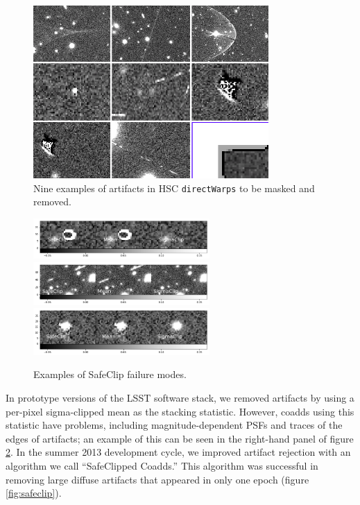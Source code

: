 \documentclass[DM,authoryear,toc]{lsstdoc}
\begin{document}
\begin{figure}
\begin{centering}
\includegraphics[width=0.8\textwidth]{figures/9examples.png}
\par\end{centering}
\caption{\label{fig:NineExamples} Nine examples of artifacts in HSC \texttt{directWarps} to be masked and removed.}
\end{figure}

\begin{figure}
\begin{centering}
\includegraphics[width=0.6\textwidth]{figures/safeClip1.png}
\includegraphics[width=0.6\textwidth]{figures/safeClip2.png}
\includegraphics[width=0.6\textwidth]{figures/safeClip3.png}
\par\end{centering}
\caption{Examples of SafeClip failure modes. \label{fig:safeClipExamples}}
\end{figure}

In prototype versions of the LSST software stack, we removed artifacts by using a per-pixel sigma-clipped mean as the stacking statistic.
However, coadds using this statistic have problems, including magnitude-dependent PSFs and traces of the edges of artifacts; an example of this can be seen in the right-hand panel of figure \ref{fig:safeClipExamples}.
In the summer 2013 development cycle, we improved artifact rejection with an algorithm we call ``SafeClipped Coadds.''
This algorithm was successful in removing large diffuse artifacts that appeared in only one epoch (figure \ref{fig:safeclip}).
\end{document}
